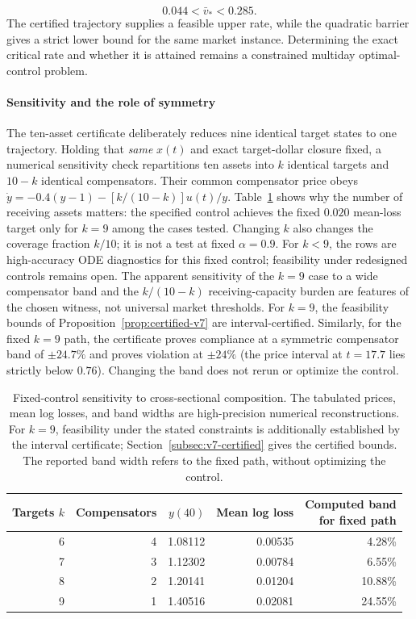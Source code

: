 \documentclass[review,hidelinks,onefignum,onetabnum]{siamonline250211}
\begin{document}
\begin{equation}\label{eq:v7-rate-bracket}
\boxed{\qquad 0.044<\bar v_*<0.285.\qquad}
\end{equation}
The certified trajectory supplies a feasible upper rate, while the quadratic barrier gives a strict lower bound for the same market instance. Determining the exact critical rate and whether it is attained remains a constrained multiday optimal-control problem.
\paragraph{Sensitivity and the role of symmetry}
The ten-asset certificate deliberately reduces nine identical target states to one trajectory. Holding that \emph{same} $x(t)$ and exact target-dollar closure fixed, a numerical sensitivity check repartitions ten assets into $k$ identical targets and $10-k$ identical compensators. Their common compensator price obeys $\dot y=-0.4(y-1)-[k/(10-k)]u(t)/y$. Table~\ref{tab:sensitivity} shows why the number of receiving assets matters: the specified control achieves the fixed $0.020$ mean-loss target only for $k=9$ among the cases tested. Changing $k$ also changes the coverage fraction $k/10$; it is not a test at fixed $\alpha=0.9$. For $k<9$, the rows are high-accuracy ODE diagnostics for this fixed control; feasibility under redesigned controls remains open. The apparent sensitivity of the $k=9$ case to a wide compensator band and the $k/(10-k)$ receiving-capacity burden are features of the chosen witness, not universal market thresholds. For $k=9$, the feasibility bounds of Proposition~\ref{prop:certified-v7} are interval-certified. Similarly, for the fixed $k=9$ path, the certificate proves compliance at a symmetric compensator band of $\pm24.7\%$ and proves violation at $\pm24\%$ (the price interval at $t=17.7$ lies strictly below $0.76$). Changing the band does not rerun or optimize the control.
\begin{table}[H]\centering\small
\caption{Fixed-control sensitivity to cross-sectional composition. The tabulated prices, mean log losses, and band widths are high-precision numerical reconstructions. For $k=9$, feasibility under the stated constraints is additionally established by the interval certificate; Section~\ref{subsec:v7-certified} gives the certified bounds. The reported band width refers to the fixed path, without optimizing the control.}\label{tab:sensitivity}
\begin{tabular}{@{}rrrrr@{}}\toprule
Targets $k$ & Compensators & $y(40)$ & Mean log loss & \shortstack{Computed band\\for fixed path} \\\midrule
6 & 4 & 1.08112 & 0.00535 & 4.28\%\\
7 & 3 & 1.12302 & 0.00784 & 6.55\%\\
8 & 2 & 1.20141 & 0.01204 & 10.88\%\\
9 & 1 & 1.40516 & 0.02081 & 24.55\%\\
\bottomrule\end{tabular}
\end{table}
\end{document}
